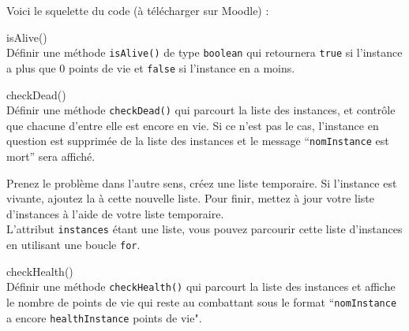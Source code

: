 Voici le squelette du code (à télécharger sur Moodle) :



\begin{Exercice}[5 minutes] isAlive()\\
    Définir une méthode \lstinline{isAlive()} de type \lstinline{boolean} qui retournera \lstinline{true} si l'instance a plus que 0 points de vie et \lstinline{false} si l'instance en a moins.

\begin{solution}
	
\end{solution}
\end{Exercice}


\begin{Exercice}[10 minutes] checkDead()\\
    Définir une méthode \lstinline{checkDead()} qui parcourt la liste des instances, et contrôle que chacune d'entre elle est encore en vie. Si ce n'est pas le cas, l'instance en question est supprimée de la liste des instances et le message ``\lstinline{nomInstance} est mort'' sera affiché.
    
\begin{conseil}
Prenez le problème dans l'autre sens, créez une liste temporaire. Si l'instance est vivante, ajoutez la à cette nouvelle liste. Pour finir, mettez à jour votre liste d'instances à l'aide de votre liste temporaire.\\
L'attribut \lstinline{instances} étant une liste, vous pouvez parcourir cette liste d'instances en utilisant une boucle \lstinline{for}. 

\end{conseil}

\begin{solution}
	
\end{solution}
\end{Exercice}

\begin{Exercice}[5 minutes] checkHealth()\\
    Définir une méthode \lstinline{checkHealth()} qui parcourt la liste des instances et affiche le nombre de points de vie qui reste au combattant sous le format ``\lstinline{nomInstance} a encore \lstinline{healthInstance} points de vie". 

\begin{solution}
	
\end{solution}
\end{Exercice}

